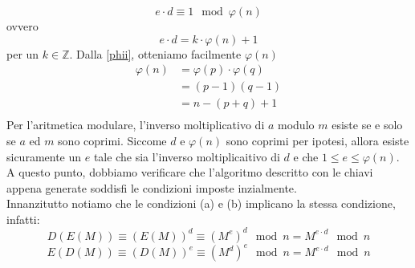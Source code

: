 \documentclass[italian,A4,12pt]{article}
\begin{document}
      $$e\cdot d \equiv 1 \mod{\varphi(n)}$$
      ovvero
      $$e\cdot d = k\cdot \varphi(n) +1$$
      per un $k\in\mathbb{Z}$.
      Dalla \eqref{phii}, otteniamo facilmente $\varphi(n)$
      \begin{align*}
        \varphi(n) &= \varphi(p)\cdot\varphi(q)\\
        &= (p-1)(q-1)\\
        &= n-(p+q)+1\\
      \end{align*}
      Per l'aritmetica modulare, l'inverso moltiplicativo di $a$ modulo $m$ esiste se e solo se $a$ ed $m$ sono coprimi. Siccome $d$ e $\varphi(n)$ sono coprimi per ipotesi, allora esiste sicuramente un $e$ tale che sia l'inverso moltiplicaitivo di $d$ e che $1\leq e \leq \varphi(n)$.\\
      A questo punto, dobbiamo verificare che l'algoritmo descritto con le chiavi appena generate soddisfi le condizioni imposte inzialmente.\\
      Innanzitutto notiamo che le condizioni (a) e (b) implicano la stessa condizione, infatti:
      \begin{equation}
        D(E(M))\equiv (E(M))^d\equiv (M^e)^d \mod{n}=M^{e\cdot d} \mod{n} \label{finale}
      \end{equation}
      $$E(D(M))\equiv (D(M))^e\equiv (M^d)^e \mod{n}=M^{e\cdot d} \mod{n}$$
\end{document}
